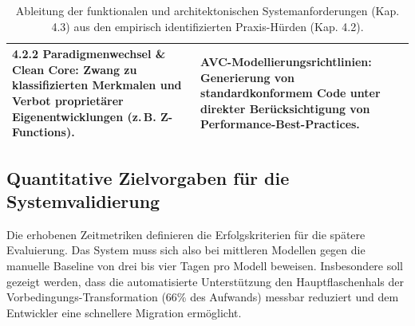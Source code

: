 \begin{table}[htbp]
\begin{tabularx}{\textwidth}{@{} 
        >{\raggedright\arraybackslash}p{7cm} 
        >{\raggedright\arraybackslash}X @{}}
        \textbf{4.2.2 Paradigmenwechsel \& Clean Core:} \newline
        Zwang zu klassifizierten Merkmalen und Verbot proprietärer Eigenentwicklungen (z.\,B. Z-Functions). & 
        \textbf{\ac{AVC}-Modellierungsrichtlinien:} \newline
        Generierung von standardkonformem Code unter direkter Berücksichtigung von Performance-Best-Practices. \\
        
        \bottomrule
    \end{tabularx}
    \caption{Ableitung der funktionalen und architektonischen Systemanforderungen (Kap. 4.3) aus den empirisch identifizierten Praxis-Hürden (Kap. 4.2).}
\end{table}

\subsection{Quantitative Zielvorgaben für die Systemvalidierung}
Die erhobenen Zeitmetriken definieren die Erfolgskriterien für die spätere Evaluierung. Das System muss sich also bei mittleren Modellen gegen die manuelle Baseline von drei bis vier Tagen pro Modell beweisen. Insbesondere soll gezeigt werden, dass die automatisierte Unterstützung den Hauptflaschenhals der Vorbedingungs-Transformation (66\% des Aufwands) messbar reduziert und dem Entwickler eine schnellere Migration ermöglicht.